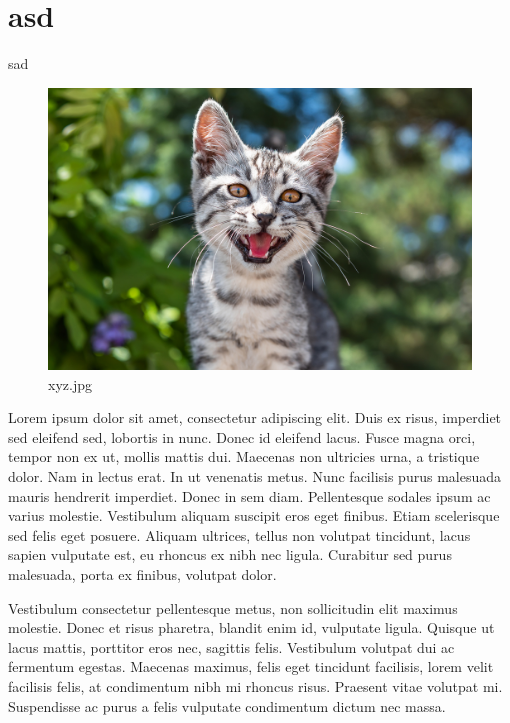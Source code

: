 \chapter{asd}sad
\begin{figure}[htpb]
\centering
\includegraphics[width=\textwidth,height=\textheight,keepaspectratio]{../../static/xyz.jpg}
\caption{xyz.jpg}
\end{figure}Lorem ipsum dolor sit amet, consectetur adipiscing elit. Duis ex risus, imperdiet sed eleifend sed, lobortis in nunc. Donec id eleifend lacus. Fusce magna orci, tempor non ex ut, mollis mattis dui. Maecenas non ultricies urna, a tristique dolor. Nam in lectus erat. In ut venenatis metus. Nunc facilisis purus malesuada mauris hendrerit imperdiet. Donec in sem diam. Pellentesque sodales ipsum ac varius molestie. Vestibulum aliquam suscipit eros eget finibus. Etiam scelerisque sed felis eget posuere. Aliquam ultrices, tellus non volutpat tincidunt, lacus sapien vulputate est, eu rhoncus ex nibh nec ligula. Curabitur sed purus malesuada, porta ex finibus, volutpat dolor.

Vestibulum consectetur pellentesque metus, non sollicitudin elit maximus molestie. Donec et risus pharetra, blandit enim id, vulputate ligula. Quisque ut lacus mattis, porttitor eros nec, sagittis felis. Vestibulum volutpat dui ac fermentum egestas. Maecenas maximus, felis eget tincidunt facilisis, lorem velit facilisis felis, at condimentum nibh mi rhoncus risus. Praesent vitae volutpat mi. Suspendisse ac purus a felis vulputate condimentum dictum nec massa.